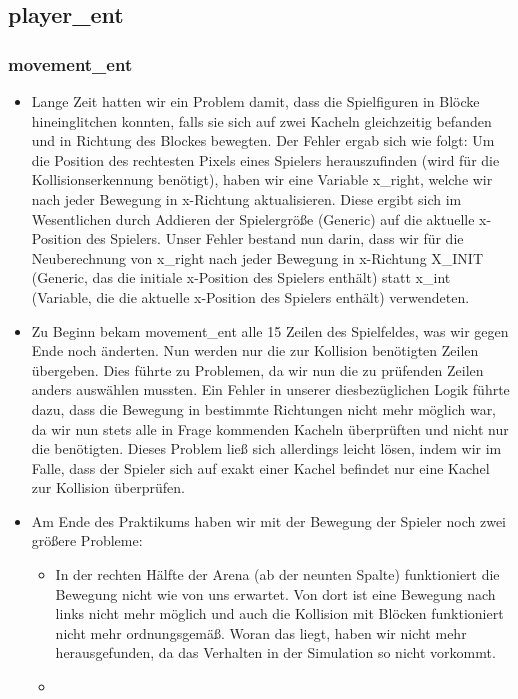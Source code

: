\documentclass[parskip=full]{scrartcl}
\begin{document}
			\subsection{player\_ent}

				\subsubsection{movement\_ent}
					\begin{itemize}
						\item Lange Zeit hatten wir ein Problem damit, dass die Spielfiguren in Blöcke hineinglitchen konnten, falls sie sich auf zwei Kacheln gleichzeitig befanden und in Richtung des Blockes bewegten. Der Fehler ergab sich wie folgt: 
						Um die Position des rechtesten Pixels eines Spielers herauszufinden (wird für die Kollisionserkennung benötigt), haben wir eine Variable x\_right, welche wir nach jeder Bewegung in x-Richtung aktualisieren. Diese ergibt sich im Wesentlichen durch Addieren der Spielergröße (Generic) auf die aktuelle x-Position des Spielers. 
						Unser Fehler bestand nun darin, dass wir für die Neuberechnung von x\_right nach jeder Bewegung in x-Richtung X\_INIT (Generic, das die initiale x-Position des Spielers enthält) statt x\_int (Variable, die die aktuelle x-Position des Spielers enthält) verwendeten.
						\item Zu Beginn bekam movement\_ent alle 15  Zeilen des Spielfeldes, was wir gegen Ende noch änderten. Nun werden nur die zur Kollision benötigten Zeilen übergeben. 
						Dies führte zu Problemen, da wir nun die zu prüfenden Zeilen anders auswählen mussten. Ein Fehler in unserer diesbezüglichen Logik führte dazu, dass die Bewegung in bestimmte Richtungen nicht mehr möglich war, da wir nun stets alle in Frage kommenden Kacheln überprüften und nicht nur die benötigten. Dieses Problem ließ sich allerdings leicht lösen, indem wir im Falle, dass der Spieler sich auf exakt einer Kachel befindet nur eine Kachel zur Kollision überprüfen.
						\item Am Ende des Praktikums haben wir mit der Bewegung der Spieler noch zwei größere Probleme:
						\begin{itemize}
							\item In der rechten Hälfte der Arena (ab der neunten Spalte) funktioniert die Bewegung nicht wie von uns erwartet. Von dort ist eine Bewegung nach links nicht mehr möglich und auch die Kollision mit Blöcken funktioniert nicht mehr ordnungsgemäß. Woran das liegt, haben wir nicht mehr herausgefunden, da das Verhalten in der Simulation so nicht vorkommt.
							\item %
						\end{itemize}
					\end{itemize}
					
\end{document}
